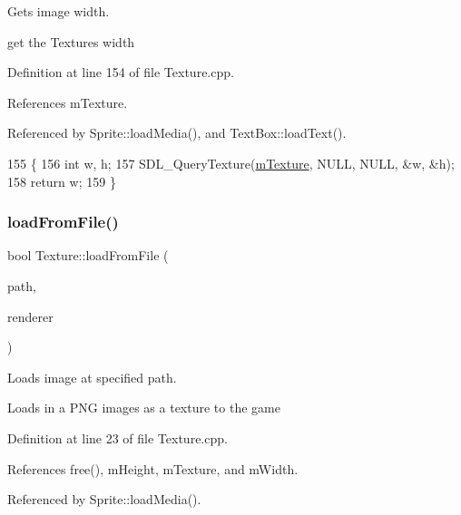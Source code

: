 Gets image width. 

get the Textures width 

Definition at line 154 of file Texture.\+cpp.



References m\+Texture.



Referenced by Sprite\+::load\+Media(), and Text\+Box\+::load\+Text().


\begin{DoxyCode}
155 \{
156     \textcolor{keywordtype}{int} w, h;
157     SDL\_QueryTexture(\hyperlink{class_texture_a28e61626f21dd1c69968e53687a13424}{mTexture}, NULL, NULL, &w, &h);
158     \textcolor{keywordflow}{return} w;
159 \}
\end{DoxyCode}
\mbox{\label{class_texture_a1c143b8aa5f134bb5a8c9d4c3d950d2f}} 
\subsubsection{\texorpdfstring{load\+From\+File()}{loadFromFile()}}
{\footnotesize\ttfamily bool Texture\+::load\+From\+File (\begin{DoxyParamCaption}\item[{std\+::string}]{path,  }\item[{S\+D\+L\+\_\+\+Renderer $\ast$}]{renderer }\end{DoxyParamCaption})}



Loads image at specified path. 

Loads in a P\+NG images as a texture to the game 

Definition at line 23 of file Texture.\+cpp.



References free(), m\+Height, m\+Texture, and m\+Width.



Referenced by Sprite\+::load\+Media().


